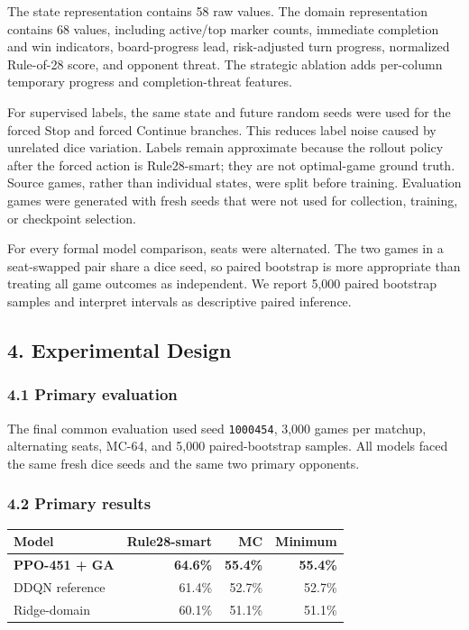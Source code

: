 \documentclass[
  11pt,
]{article}
\newcounter{none} %
\begin{document}
The state representation contains 58 raw values. The domain
representation contains 68 values, including active/top marker counts,
immediate completion and win indicators, board-progress lead,
risk-adjusted turn progress, normalized Rule-of-28 score, and opponent
threat. The strategic ablation adds per-column temporary progress and
completion-threat features.

For supervised labels, the same state and future random seeds were used
for the forced Stop and forced Continue branches. This reduces label
noise caused by unrelated dice variation. Labels remain approximate
because the rollout policy after the forced action is Rule28-smart; they
are not optimal-game ground truth. Source games, rather than individual
states, were split before training. Evaluation games were generated with
fresh seeds that were not used for collection, training, or checkpoint
selection.

For every formal model comparison, seats were alternated. The two games
in a seat-swapped pair share a dice seed, so paired bootstrap is more
appropriate than treating all game outcomes as independent. We report
5,000 paired bootstrap samples and interpret intervals as descriptive
paired inference.

\subsection{4. Experimental Design}\label{4-experimental-design}

\subsubsection{4.1 Primary evaluation}\label{41-primary-evaluation}

The final common evaluation used seed \texttt{1000454}, 3,000 games per
matchup, alternating seats, MC-64, and 5,000 paired-bootstrap samples.
All models faced the same fresh dice seeds and the same two primary
opponents.

\subsubsection{4.2 Primary results}\label{42-primary-results}

{\def\LTcaptype{none} %
\begin{longtable}[]{@{}lrrr@{}}
\toprule\noalign{}
Model & Rule28-smart & MC & Minimum \\
\midrule\noalign{}
\endhead
\bottomrule\noalign{}
\endlastfoot
\textbf{PPO-451 + GA} & \textbf{64.6\%} & \textbf{55.4\%} &
\textbf{55.4\%} \\
DDQN reference & 61.4\% & 52.7\% & 52.7\% \\
Ridge-domain & 60.1\% & 51.1\% & 51.1\% \\
\end{longtable}
}
\end{document}

